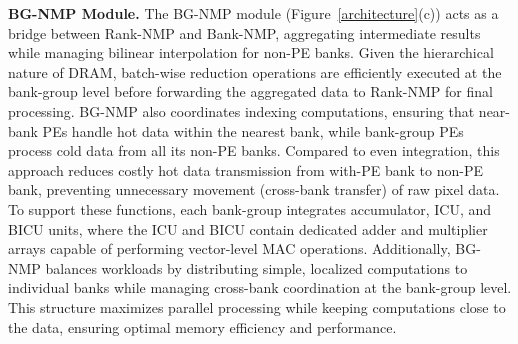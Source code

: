 \documentclass[sigconf]{acmart}
\begin{document}
{\bf BG-NMP Module.} The BG-NMP module (Figure~\ref{architecture}(c)) acts as a bridge between Rank-NMP and Bank-NMP, aggregating intermediate results while managing bilinear interpolation for non-PE banks. Given the hierarchical nature of DRAM, batch-wise reduction operations are efficiently executed at the bank-group level before forwarding the aggregated data to Rank-NMP for final processing. BG-NMP also coordinates indexing computations, ensuring that near-bank PEs handle hot data within the nearest bank, while bank-group PEs process cold data from all its non-PE banks. Compared to even integration, this approach reduces costly hot data transmission from with-PE bank to non-PE bank, preventing unnecessary movement (cross-bank transfer) of raw pixel data. {To support these functions, each bank-group integrates accumulator, ICU, and BICU units, where the ICU and BICU contain dedicated adder and multiplier arrays capable of performing vector-level MAC operations.} Additionally, BG-NMP balances workloads by distributing simple, localized computations to individual banks while managing cross-bank coordination at the bank-group level. This structure maximizes parallel processing while keeping computations close to the data, ensuring optimal memory efficiency and performance.




\end{document}
